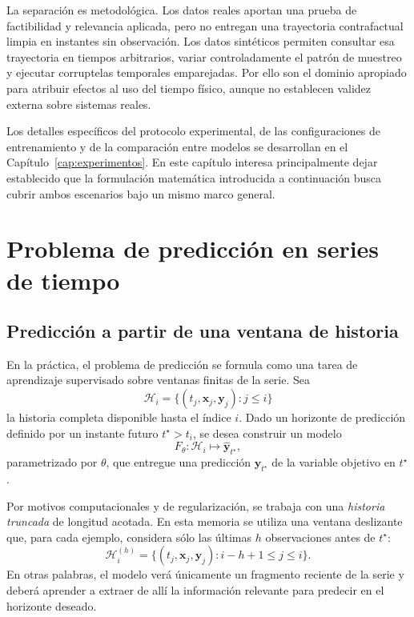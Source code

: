 \hfill

La separación es metodológica. Los datos reales aportan una prueba de factibilidad y relevancia aplicada, pero no entregan una trayectoria contrafactual limpia en instantes sin observación. Los datos sintéticos permiten consultar esa trayectoria en tiempos arbitrarios, variar controladamente el patrón de muestreo y ejecutar corruptelas temporales emparejadas. Por ello son el dominio apropiado para atribuir efectos al uso del tiempo físico, aunque no establecen validez externa sobre sistemas reales.

\hfill

Los detalles específicos del protocolo experimental, de las configuraciones de entrenamiento y de la comparación entre modelos se desarrollan en el Capítulo~\ref{cap:experimentos}. En este capítulo interesa principalmente dejar establecido que la formulación matemática introducida a continuación busca cubrir ambos escenarios bajo un mismo marco general.

\section{Problema de predicción en series de tiempo}

\subsection{Predicción a partir de una ventana de historia}

En la práctica, el problema de predicción se formula como una tarea de aprendizaje supervisado sobre ventanas finitas de la serie. Sea
\begin{equation}
    \mathcal{H}_i = \{(t_j, \mathbf{x}_j, \mathbf{y}_j) : j \le i\}
\end{equation}
la historia completa disponible hasta el índice $i$. Dado un horizonte de predicción definido por un instante futuro $t^\star > t_i$, se desea construir un modelo
\begin{equation}
    F_\theta : \mathcal{H}_i \longmapsto \widehat{\mathbf{y}}_{t^\star},
\end{equation}
parametrizado por $\theta$, que entregue una predicción $\widehat{\mathbf{y}}_{t^\star}$ de la variable objetivo en $t^\star$.

\hfill

Por motivos computacionales y de regularización, se trabaja con una \textit{historia truncada} de longitud acotada. En esta memoria se utiliza una ventana deslizante que, para cada ejemplo, considera sólo las últimas $h$ observaciones antes de $t^\star$:
\begin{equation}
    \mathcal{H}^{(h)}_i
    = \{(t_j, \mathbf{x}_j, \mathbf{y}_j) : i-h+1 \le j \le i\}.
\end{equation}
En otras palabras, el modelo verá únicamente un fragmento reciente de la serie y deberá aprender a extraer de allí la información relevante para predecir en el horizonte deseado.

